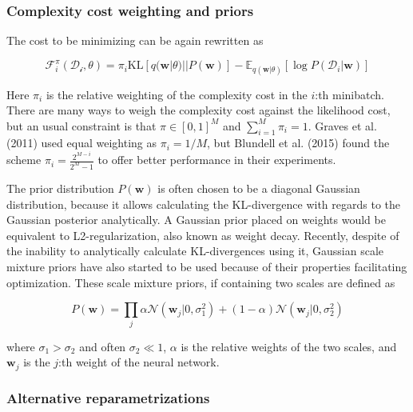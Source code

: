 	
	
	\subsubsection*{Complexity cost weighting and priors}
	
	The cost to be minimizing can be again rewritten as 
	
	\begin{equation}
		\mathcal{F}^\pi_i(\mathcal{D_i}, \theta) = \pi_i \text{KL}[q(\pmb{w}|\theta) || P(\pmb{w})] - \mathbb{E}_{q(\pmb{w}|\theta)}[\log P(\mathcal{D}_i|\pmb{w})]
	\end{equation}
	
	Here $\pi_i$ is the relative weighting of the complexity cost in the $i$:th minibatch. 
	There are many ways to weigh the complexity cost against the likelihood cost, but an usual constraint is that $\pi \in [0,1]^M$ and $\sum_{i=1}^{M} \pi_i = 1$. Graves et al. (2011) \cite{graves_practical_2011} used equal weighting as $\pi_i = 1/M$, but Blundell et al. (2015) \cite{blundell_weight_2015} found the scheme $\pi_i =\frac{2^{M-i}}{2^M - 1}$ to offer better performance in their experiments. 

	
	The prior distribution $P(\pmb{w})$ is often chosen to be a diagonal Gaussian distribution, because it allows calculating the KL-divergence with regards to the Gaussian posterior analytically. A Gaussian prior placed on weights would be equivalent to L2-regularization, also known as weight decay. Recently, despite of the inability to analytically calculate KL-divergences using it, Gaussian scale mixture priors have also started to be used \cite{blundell_weight_2015, shridhar_comprehensive_2019} because of their properties facilitating optimization. These scale mixture priors, if containing two scales are defined as 
	
	\begin{equation}
	\label{eq:gsm}
		P(\pmb{w}) = 
		\prod_{j}\alpha \mathcal{N}(\pmb{w}_j|0,\sigma_1^2) + (1-\alpha)\mathcal{N}(\pmb{w}_j|0,\sigma_2^2)
	\end{equation}  
	
	where $\sigma_1 > \sigma_2$ and often $\sigma_2 \ll 1$, $\alpha$ is the relative weights of the two scales, and $\pmb{w}_j$ is the $j$:th weight of the neural network. 
	
	\subsubsection*{Alternative reparametrizations}

